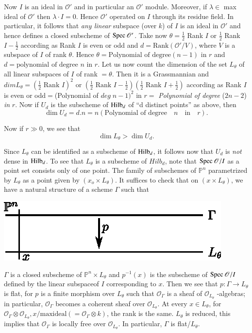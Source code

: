 {Now $I$ is an ideal in $\mathscr{O}'$ and in particular an $\mathscr{O}'$ module. Moreover, if $\lambda\in$ max ideal of $\mathscr{O}'$ then $\lambda \cdot I=0$. Hence $\mathscr{O}'$ operated on $I$ through its residue field. In particular, it follows that {\em any linear} subspace (over $k$) of $I$ is an ideal in $\mathscr{O}'$ and hence defines a closed subscheme of $\operatorname{Spec} \mathscr{O}'$. Take now $\theta=\frac{1}{2}$ Rank $I$ or $\frac{1}{2}$ Rank $I-\frac{1}{2}$ according as Rank $I$ is even or odd and $d=\text{Rank}(\mathscr{O}'/V)$, where $V$ is a subspace of $I$ of rank $\theta$. Hence $\theta=\text{Polynomial of degree}(n-1)$ in $r$ and $d=\text{polynomial of degree } n \text{ in } r$. Let us now count the dimension of the set $L_{\theta}$ of all linear subspaces of $I$ of rank $=\theta$. Then it is a Grassmannian and $dim L_{\theta}=\left(\frac{1}{2}\text{ Rank } I\right)^{2}$ or $\left(\frac{1}{2} \text{ Rank } I-\frac{1}{2}\right)\left(\frac{1}{2}\text{ Rank } I+\frac{1}{2}\right)$ according as Rank $I$ is even or odd$=$(Polynomial of $deg \;  n-1)^{2}$ in $r=$ {\em Polynomial of degree} ($2n-2$) {\em in} $r$. Now if $U_{d}$ is the subscheme of $\operatorname{Hilb}_{d}$ of ``d distinct points'' as above, then
$$
\dim U_{d}=d.n=n(\text{Polynomial of degree}\quad n\quad \text{in}\quad r).
$$

Now if $r\gg0$, we see that
$$
\dim L_{\theta}> \dim U_{d}.
$$

Since $L_{\theta}$ can be identified as a subscheme of $\operatorname{Hilb}_{d}$, it
follows now that $U_{d}$ is {\em not} dense in $\operatorname{Hilb}_{d}$. To see
that $L_{\theta}$ is a subscheme of $Hilb_{d}$, note that $\operatorname{Spec}
\mathscr{O}/I$ as a point set consists only of one point. The family
of subschemes of $\mathbb{P}^{n}$ parametrized by $L_{\theta}$ as a
point given by $(x_{o}\times L_{\theta})$. It suffices to check that
on $(x\times L_{\theta})$, we have a natural structure of a scheme
$\Gamma$ such that  
\begin{center}
\centering
\includegraphics{figure/chap1-fig1.eps}
\end{center}
$\Gamma$ is a closed subscheme of $\mathbb{P}^{n}\times L_{\theta}$ and $p^{-1}(x)$ is the subscheme of $\operatorname{Spec} \mathscr{O}/I$ defined by the linear subspace\pageoriginale of $I$ corresponding to $x$. Then we see that $p:\Gamma \rightarrow L_{\theta}$ is flat, for $p$ is a finite morphism over $L_{\theta}$ such that $\mathscr{O}_{\Gamma}$ is a sheaf of $\mathscr{O}_{L_{\theta}}$ -algebras; in particular, $\mathscr{O}_{\Gamma}$ becomes a coherent sheaf over $\mathscr{O}_{L_{\theta}}$. At every $x\in L_{\theta}$, for $\mathscr{O}_{\Gamma}\otimes\mathscr{O}_{L_{\theta}}, x/\text{maxideal} (=\mathscr{O}_{\Gamma}\otimes k)$, the rank is the same. $L_{\theta}$ is reduced, this implies that $\mathscr{O}_{\Gamma}$ is locally free over $\mathscr{O}_{L_{\theta}}$. In particular, $\Gamma$ is flat/$L_{\theta}$.

}
